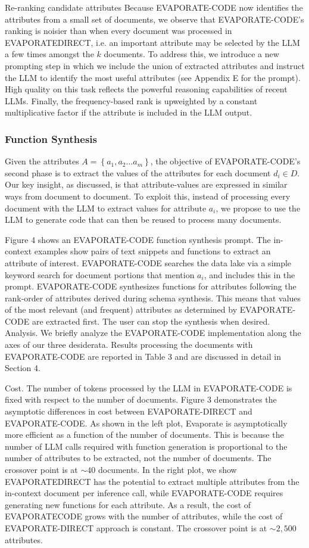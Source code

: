 \documentclass[10pt]{article}
\begin{document}
Re-ranking candidate attributes Because EVAPORATE-CODE now identifies the attributes from a small set of documents, we observe that EVAPORATE-CODE's ranking is noisier than when every document was processed in EVAPORATEDIRECT, i.e. an important attribute may be selected by the LLM a few times amongst the $k$ documents. To address this, we introduce a new prompting step in which we include the union of extracted attributes and instruct the LLM to identify the most useful attributes (see Appendix E for the prompt). High quality on this task reflects the powerful reasoning capabilities of recent LLMs. Finally, the frequency-based rank is upweighted by a constant multiplicative factor if the attribute is included in the LLM output.

\subsubsection{Function Synthesis}
Given the attributes $A=\left\{a_{1}, a_{2} \ldots a_{m}\right\}$, the objective of EVAPORATE-CODE's second phase is to extract the values of the attributes for each document $d_{i} \in D$. Our key insight, as discussed, is that attribute-values are expressed in similar ways from document to document. To exploit this, instead of processing every document with the LLM to extract values for attribute $a_{i}$, we propose to use the LLM to generate code that can then be reused to process many documents.

Figure 4 shows an EVAPORATE-CODE function synthesis prompt. The in-context examples show pairs of text snippets and functions to extract an attribute of interest. EVAPORATE-CODE searches the data lake via a simple keyword search for document portions that mention $a_{i}$, and includes this in the prompt. EVAPORATE-CODE synthesizes functions for attributes following the rank-order of attributes derived during schema synthesis. This means that values of the most relevant (and frequent) attributes as determined by EVAPORATE-CODE are extracted first. The user can stop the synthesis when desired. Analysis. We briefly analyze the EVAPORATE-CODE implementation along the axes of our three desiderata. Results processing the documents with EVAPORATE-CODE are reported in Table 3 and are discussed in detail in Section 4.

Cost. The number of tokens processed by the LLM in EVAPORATE-CODE is fixed with respect to the number of documents. Figure 3 demonstrates the asymptotic differences in cost between EVAPORATE-DIRECT and EVAPORATE-CODE. As shown in the left plot, Evaporate is asymptotically more efficient as a function of the number of documents. This is because the number of LLM calls required with function generation is proportional to the number of attributes to be extracted, not the number of documents. The crossover point is at $\sim 40$ documents. In the right plot, we show EVAPORATEDIRECT has the potential to extract multiple attributes from the in-context document per inference call, while EVAPORATE-CODE requires generating new functions for each attribute. As a result, the cost of EVAPORATECODE grows with the number of attributes, while the cost of EVAPORATE-DIRECT approach is constant. The crossover point is at $\sim 2,500$ attributes.
\end{document}
